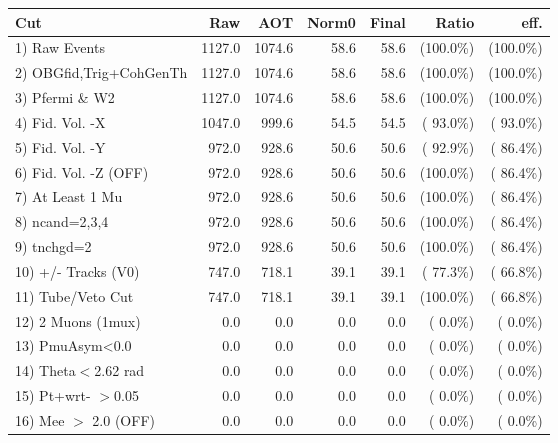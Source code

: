  \begin{table}[h!]\centering
 \begin{tabular}{||l||r|r|r|r|r|r||}
 \hline
 \hline
 Cut & Raw & AOT & Norm0 & Final & Ratio & eff.       \\
 \hline
  1) Raw Events           &       1127.0 &       1074.6 &         58.6 &         58.6 & (100.0\%) & (100.0\%) \\
  2) OBGfid,Trig+CohGenTh &       1127.0 &       1074.6 &         58.6 &         58.6 & (100.0\%) & (100.0\%) \\
  3) Pfermi \& W2         &       1127.0 &       1074.6 &         58.6 &         58.6 & (100.0\%) & (100.0\%) \\
  4) Fid. Vol. -X         &       1047.0 &        999.6 &         54.5 &         54.5 & ( 93.0\%) & ( 93.0\%) \\
  5) Fid. Vol. -Y         &        972.0 &        928.6 &         50.6 &         50.6 & ( 92.9\%) & ( 86.4\%) \\
  6) Fid. Vol. -Z (OFF)   &        972.0 &        928.6 &         50.6 &         50.6 & (100.0\%) & ( 86.4\%) \\
  7) At Least 1 Mu        &        972.0 &        928.6 &         50.6 &         50.6 & (100.0\%) & ( 86.4\%) \\
  8) ncand=2,3,4          &        972.0 &        928.6 &         50.6 &         50.6 & (100.0\%) & ( 86.4\%) \\
  9) tnchgd=2             &        972.0 &        928.6 &         50.6 &         50.6 & (100.0\%) & ( 86.4\%) \\
 10) +/- Tracks (V0)      &        747.0 &        718.1 &         39.1 &         39.1 & ( 77.3\%) & ( 66.8\%) \\
 11) Tube/Veto Cut        &        747.0 &        718.1 &         39.1 &         39.1 & (100.0\%) & ( 66.8\%) \\
 12) 2 Muons (1mux)       &          0.0 &          0.0 &          0.0 &          0.0 & (  0.0\%) & (  0.0\%) \\
 13) PmuAsym<0.0          &          0.0 &          0.0 &          0.0 &          0.0 & (  0.0\%) & (  0.0\%) \\
 14) Theta$<$2.62 rad     &          0.0 &          0.0 &          0.0 &          0.0 & (  0.0\%) & (  0.0\%) \\
 15) Pt+wrt- $>$0.05      &          0.0 &          0.0 &          0.0 &          0.0 & (  0.0\%) & (  0.0\%) \\
 16) Mee $>$ 2.0  (OFF)   &          0.0 &          0.0 &          0.0 &          0.0 & (  0.0\%) & (  0.0\%) \\

\end{tabular}
\end{table}
